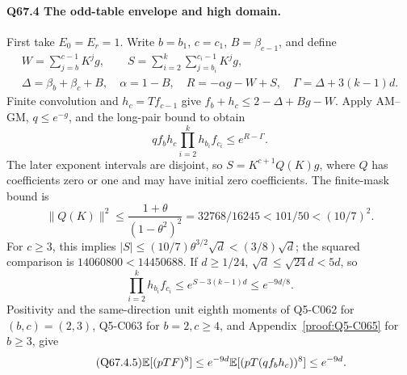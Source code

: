 \paragraph{Q67.4 The odd-table envelope and high domain.}
First take \(E_0=\allowbreak E_r=\allowbreak 1\). Write \(b=\allowbreak b_1\), \(c=\allowbreak c_1\),
\(B=\allowbreak \beta_{c-1}\), and define
\begin{equation}\tag{Q67.4.1}\label{eq:Q67:4.1}
\begin{gathered}
W=\sum_{j=b}^{c-1}K^jg,\qquad
S=\sum_{i=2}^k\sum_{j=b_i}^{c_i-1}K^jg,\\
\Delta=\beta_b+\beta_c+B,\quad\alpha=1-B,\quad
R=-\alpha g-W+S,\quad\Gamma=\Delta+3(k-1)d.
\end{gathered}
\end{equation}
Finite convolution and \(h_c=\allowbreak Tf_{c-1}\) give
\(f_b+h_c\le\allowbreak 2-\Delta+Bg-W\).
Apply AM--GM, \(q\le\allowbreak  e^{-g}\), and the long-pair bound to obtain
\begin{equation}\tag{Q67.4.2}\label{eq:Q67:4.2}
qf_bh_c\prod_{i=2}^kh_{b_i}f_{c_i}\le e^{R-\Gamma}.
\end{equation}
The later exponent intervals are disjoint, so
\(S=\allowbreak K^{c+1}Q(K)g\), where \(Q\) has coefficients zero or one and
may have initial zero coefficients. The finite-mask bound is
\begin{equation}\tag{Q67.4.3}\label{eq:Q67:4.3}
\|Q(K)\|^2\le\frac{1+\theta}{(1-\theta^2)^2}
=32768/16245<101/50<(10/7)^2.
\end{equation}
For \(c\ge\allowbreak 3\), this implies
\(|S|\le\allowbreak (10/7)\theta^{3/2}\sqrt d<\allowbreak (3/8)\sqrt d\);
the squared comparison is \(14060800<\allowbreak 14450688\).
If \(d\ge\allowbreak 1/24\), \(\sqrt d\le\allowbreak \sqrt{24}d<\allowbreak 5d\), so
\begin{equation}\tag{Q67.4.4}\label{eq:Q67:4.4}
\prod_{i=2}^kh_{b_i}f_{c_i}
\le e^{S-3(k-1)d}\le e^{-9d/8}.
\end{equation}
Positivity and the same-direction unit eighth moments of Q5-C062
for \((b,\allowbreak c)=\allowbreak (2,\allowbreak 3)\), Q5-C063 for \(b=\allowbreak 2,\allowbreak c\ge\allowbreak 4\), and
Appendix~\ref{proof:Q5-C065} for \(b\ge\allowbreak 3\), give
\begin{equation}\tag{Q67.4.5}\label{eq:Q67:4.5}
\mathbb E[(pTF)^8]\le e^{-9d}\mathbb E[(pT(qf_bh_c))^8]\le e^{-9d}.
\end{equation}

